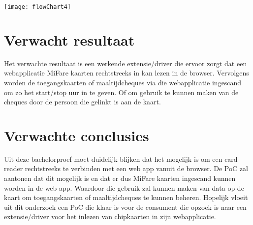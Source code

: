 \begin{center}
    \texttt{[image: flowChart4]}
\end{center}

\section{Verwacht resultaat}%
\label{sec:verwachte_resultaten}

Het verwachte resultaat is een werkende extensie/driver die ervoor zorgt dat een webapplicatie MiFare kaarten rechtstreeks in kan lezen in de browser. Vervolgens worden de toegangskaarten of maaltijdcheques via die webapplicatie ingescand om zo het start/stop uur in te geven. Of om gebruik te kunnen maken van de cheques door de persoon die gelinkt is aan de kaart.

\section{Verwachte conclusies}%
\label{sec:Verwachte_conclusies}

Uit deze bachelorproef moet duidelijk blijken dat het mogelijk is om een card reader rechtstreeks te verbinden met een web app vanuit de browser. De PoC zal aantonen dat dit mogelijk is en dat er dus MiFare kaarten ingescand kunnen worden in de web app. Waardoor die gebruik zal kunnen maken van data op de kaart om toegangskaarten of maaltijdcheques te kunnen beheren. Hopelijk vloeit uit dit onderzoek een PoC die klaar is voor de consument die opzoek is naar een extensie/driver voor het inlezen van chipkaarten in zijn webapplicatie.